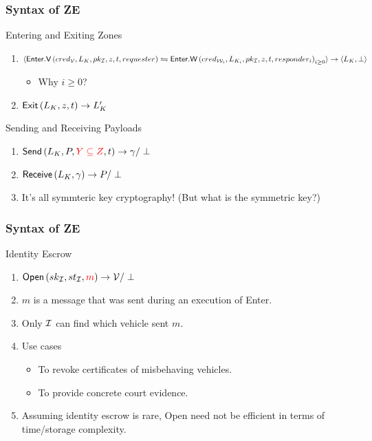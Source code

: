 \documentclass{beamer}
\begin{document}
    \begin{frame}
        \frametitle{Syntax of ZE}
        \begin{block}{Entering and Exiting Zones}
            \begin{enumerate}
                \item \(\langle
                \mathsf{Enter.V}\left(cred_{\mathcal V},L_K,pk_{\mathcal I},z,t,requester\right)
                \leftrightharpoons
                \mathsf{Enter.W}\left(cred_{\mathcal W_i},L_{K_i},pk_{\mathcal I},z,t,responder_i\right)_{i\ge
                0} \rangle \rightarrow \left\langle L_K,\perp \right\rangle\)
                \begin{itemize}
                    \item Why \(i \ge 0\)?
                \end{itemize}
                \item \(\mathsf{Exit}\left(L_K,z,t\right) \rightarrow L_K^{\prime}\)
            \end{enumerate}
        \end{block}
        \begin{block}{Sending and Receiving Payloads}
            \begin{enumerate}
                \item \(\mathsf{Send}\left(L_K,P,\textcolor{red}{Y\subseteq Z},t\right)
                \rightarrow \gamma/\perp\)
                \item \(\mathsf{Receive}\left(L_K,\gamma\right) \rightarrow P/\perp\)
                \item It's all symmteric key cryptography! (But what is the
                symmetric key?)
            \end{enumerate}
        \end{block}
    \end{frame}

    \begin{frame}
        \frametitle{Syntax of ZE}
        \begin{block}{Identity Escrow}
            \begin{enumerate}
                \item \(\mathsf{Open}\left(sk_{\mathcal I},st_{\mathcal I},\textcolor{red}{m}\right)
                \rightarrow \mathcal V/\perp\)
                \item \(m\) is a message that was sent during an execution of
                \textsf{Enter}.
                \item Only \(\mathcal I\) can find which vehicle sent \(m\).
                \item Use cases
                \begin{itemize}
                    \item To revoke certificates of misbehaving vehicles.
                    \item To provide concrete court evidence.
                \end{itemize}
                \item Assuming identity escrow is rare, \textsf{Open} need not
                be efficient in terms of time/storage complexity.
            \end{enumerate}
        \end{block}
    \end{frame}
\end{document}
